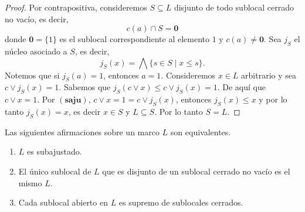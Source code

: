 \begin{proof}
    Por contrapositiva, consideremos $S\subseteq L$ disjunto de todo sublocal cerrado no vacío, es decir, 
    \[c(a)\cap S=\mathbf{0}\]
    donde $\mathbf{0}=\{1\}$ es el sublocal correspondiente al elemento $1$ y $c(a)\neq \mathbf{0}$. Sea $j_S$ el núcleo asociado a $S$, es decir,
    \[
    j_S(x)=\bigwedge\{s\in S\mid x\leq s\}.
    \]
    Notemos que si $j_S(a)=1$, entonces $a=1$. Consideremos $x\in L$ arbitrario y sea $c\vee j_S(x)=1$. Sabemos que $j_S(c\vee x)\leq c\vee j_S(x)=1$. De aquí que $c\vee x=1$. Por $(\mathbf{saju})$, $c\vee x=1=c\vee j_S(x)$, entonces $j_S(x)\leq x$ y por lo tanto $j_S(x)=x$, es decir $x\in S$ y $L\subseteq S$. Por lo tanto $S=L$. 
\end{proof}

\begin{thm}\label{Saju2orden}
    Las siguientes afirmaciones sobre un marco $L$ son equivalentes.
    \begin{enumerate}[$i)$]
        \item $L$ es subajustado.
        \item El único sublocal de $L$ que es disjunto de un sublocal cerrado no vacío es el mismo $L$.
        \item Cada sublocal abierto en $L$ es supremo de sublocales cerrados.
    \end{enumerate}
\end{thm}

